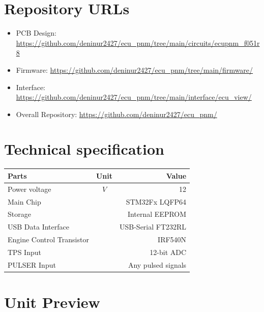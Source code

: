 \documentclass[a4paper,12pt,oneside,pdflatex,italian,final,twocolumn]{article}
\begin{document}
	\raggedright

	\section{Repository URLs}

	\begin{itemize}
		\item PCB Design: \url{https://github.com/deninur2427/ecu_pnm/tree/main/circuits/ecupnm_f051r8}

		\item Firmware: \url{https://github.com/deninur2427/ecu_pnm/tree/main/firmware/}

		\item Interface: \url{https://github.com/deninur2427/ecu_pnm/tree/main/interface/ecu_view/}

		\item Overall Repository: \url{https://github.com/deninur2427/ecu_pnm/}
	\end{itemize}

	\section{Technical specification}
	\centering
	\begin{tabular}{lcr}
		\toprule
		Parts & Unit & Value \\
		\midrule
		Power voltage & $V$ & 12 \\
		Main Chip & & STM32Fx LQFP64 \\
		Storage & & Internal EEPROM \\
		USB  Data Interface & & USB-Serial FT232RL \\
		Engine Control Transistor & & IRF540N \\
		TPS Input & & 12-bit ADC \\
		PULSER Input & & Any pulsed signals \\
		\bottomrule
	\end{tabular}

	\raggedright

	\newpage
	\section{Unit Preview}
\end{document}
